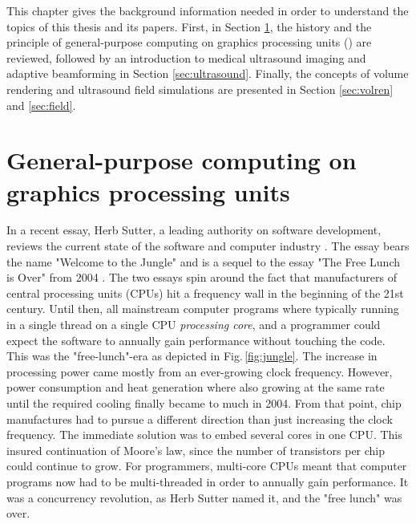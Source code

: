 %

This chapter gives the background information needed in order to understand the topics of this thesis and its papers. First, in Section \ref{sec:gpgpu}, the history and the principle of general-purpose computing on graphics processing units () are reviewed, followed by an introduction to medical ultrasound imaging and adaptive beamforming in Section \ref{sec:ultrasound}. Finally, the concepts of volume rendering and ultrasound field simulations are presented in Section \ref{sec:volren} and \ref{sec:field}.

\section{General-purpose computing on graphics processing units}\label{sec:gpgpu}
In a recent essay, Herb Sutter, a leading authority on software development, reviews the current state of the software and computer industry \cite{HerbSutter}. The essay bears the name "Welcome to the Jungle" and is a sequel to the essay "The Free Lunch is Over" from 2004 \cite{HerbSuttera}. The two essays spin around the fact that manufacturers of central processing units (CPUs) hit a frequency wall in the beginning of the 21st century. Until then, all mainstream computer programs where typically running in a single thread on a single CPU \textit{processing core}, and a programmer could expect the software to annually gain performance without touching the code. This was the "free-lunch"-era as depicted in Fig.\,\ref{fig:jungle}. The increase in processing power came mostly from an ever-growing clock frequency. However, power consumption and heat generation where also growing at the same rate until the required cooling finally became to much in 2004.  From that point, chip manufactures had to pursue a different direction  than just increasing the clock frequency. The immediate solution was to embed several cores in one CPU. This insured continuation of Moore's law, since the number of transistors per chip could continue to grow. For programmers, multi-core CPUs meant that computer programs now had to be multi-threaded in order to annually gain performance. It was a concurrency revolution, as Herb Sutter named it, and  the "free lunch" was over.

